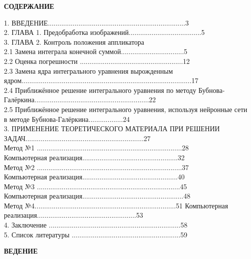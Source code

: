 \documentclass[12pt]{article}
\begin{document}
\begin{titlepage}
	\begin{center}
		
		\textbf{СОДЕРЖАНИЕ}\\
	\end{center}
	\vspace{0.5cm}
	1. ВВЕДЕНИЕ........................................................................\hfill{3}
	\\
	2. ГЛАВА 1. Предобработка изображений......................................\hfill{5}
	\\
	3. ГЛАВА 2. Контроль положения аппликатора
	\\
	2.1 Замена интеграла конечной суммой.................................\hfill{5}
	\\
	2.2 Оценка погрешности ......................................................\hfill{12}
	\\
	2.3 Замена ядра интегрального уравнения вырожденным ядром.........................................................................................\hfill{17}
	\\
	2.4 Приближённое решение интегрального уравнения по методу Бубнова-Галёркина............................................................\hfill{22}
	\\
	2.5 Приближённое решение интегрального уравнения, используя нейронные сети в методе Бубнова-Галёркина..................\hfill{24}
	\\
	3. ПРИМЕНЕНИЕ ТЕОРЕТИЧЕСКОГО МАТЕРИАЛА ПРИ РЕШЕНИИ ЗАДАЧ..............................................................\hfill{27}
	\\
	Метод №1 ............................................................................\hfill{28}
	\\
	Компьютерная реализация..................................................\hfill{32}
	\\
	Метод №2 ............................................................................\hfill{37}
	\\
	Компьютерная реализация..................................................\hfill{40}
	\\
	Метод №3 ...........................................................................\hfill{45}
	\\
	Компьютерная реализация.....................................................\hfill{48}
	\\
	Метод №4..........................................................................\hfill{51}
	Компьютерная реализация....................................................\hfill{53}
	\\
	4. Заключение .....................................................................\hfill{58}
	\\
	5. Список литературы .........................................................\hfill{59}
	\\
\end{titlepage}
\setcounter{page}{3}
\begin{center}
	\textbf{ВЕДЕНИЕ}\\
\end{center}
\end{document}
